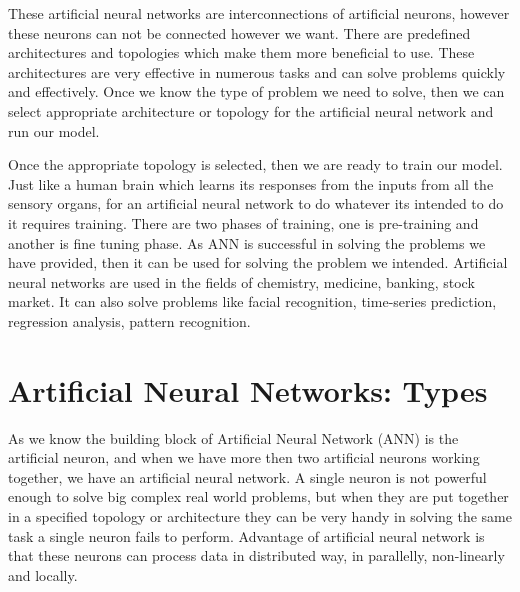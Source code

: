 \documentclass[12pt, a4paper]{report}
\begin{document}
These artificial neural networks are interconnections of artificial neurons, however these neurons can not be connected however we want. There are predefined architectures and topologies which make them more beneficial to use. These architectures are very effective in numerous tasks and can solve problems quickly and effectively. Once we know the type of problem we need to solve, then we can select appropriate  architecture or topology for the artificial neural network and run our model.\\ \par

Once the appropriate topology is selected, then we are ready to train our model. Just like a human brain which learns its responses from the inputs  from all the sensory organs, for an artificial neural network to do whatever its intended to do it requires training. There are two phases of training, one is pre-training and another is fine tuning phase. As ANN is successful in solving the problems we have provided, then it can be used for solving the problem we intended. Artificial neural networks are used in the fields of chemistry, medicine, banking, stock market. It can also solve problems like facial recognition, time-series prediction, regression analysis, pattern recognition.


\section{Artificial Neural Networks: Types}

As we know the building block of Artificial Neural Network (ANN) is the artificial neuron, and when we have more then two artificial neurons working together, we have an artificial neural network. A single neuron is not powerful enough to solve big complex real world problems, but when they are put together in a specified topology or architecture they can be very handy in solving the same task a single neuron fails to perform. Advantage of artificial neural network is that these neurons can process data in distributed way, in parallelly, non-linearly and locally. \\\par
\end{document}
